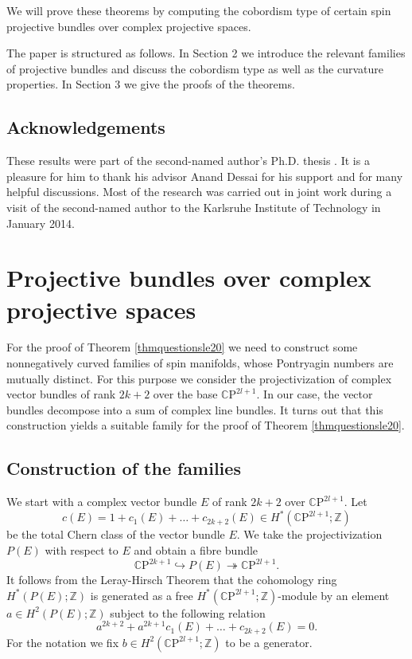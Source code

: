 \documentclass[10pt,a4paper]{amsart}
\theoremstyle{thm}
\theoremstyle{text}
\begin{document}
We will prove these theorems by computing the cobordism type of certain spin projective bundles over complex projective spaces.
\medskip

The paper  is structured as follows. In Section 2 we introduce the relevant families of projective bundles and discuss the cobordism type as well as the curvature properties. In Section 3 we give the proofs of the theorems.

\subsection*{Acknowledgements} These results were part of the second-named author's Ph.D. thesis \cite{Wei14}. It is a pleasure for him to thank  his advisor Anand Dessai for his support and for many helpful discussions. Most of the research was carried out in joint work during a visit of the second-named author to the Karlsruhe Institute of Technology in January 2014.

\section{Projective bundles over complex projective spaces}

For the proof of Theorem \ref{thmquestionsle20} we need to construct some nonnegatively curved families of spin manifolds, whose Pontryagin numbers are mutually distinct. For this purpose we consider the projectivization of complex vector bundles of rank $2k+2$ over the base  ${\mathbb{C}\mathrm{P}}^{2l+1}$.  In our case, the vector bundles decompose into a sum of complex line bundles. It turns out that this construction yields a suitable family for the proof of Theorem \ref{thmquestionsle20}.

\subsection{Construction of the families}

We start with a complex vector bundle $E$ of rank $2k+2$ over ${\mathbb{C}\mathrm{P}}^{2l+1}$. Let
\[ c(E) = 1 + c_1(E) + \ldots + c_{2k+2}(E) \in H^{\ast}({\mathbb{C}\mathrm{P}}^{2l+1}; {\mathbb{Z}})\]
be the total Chern class  of the vector bundle $E$. We take the projectivization $P(E)$ with respect to $E$  and obtain a fibre bundle 
\[ {\mathbb{C}\mathrm{P}}^{2k+1} \hookrightarrow P(E) \twoheadrightarrow {\mathbb{C}\mathrm{P}}^{2l+1}.\]
It follows from the Leray-Hirsch Theorem  that the cohomology  ring $H^{\ast}(P(E); {\mathbb{Z}})$ is generated as a free $H^{\ast}({\mathbb{C}\mathrm{P}}^{2l+1};{\mathbb{Z}})$-module by an element $a \in H^{2}(P(E); {\mathbb{Z}})$ subject to the following relation
\[ a^{2k+2} + a^{2k+1} c_1(E) + \ldots + c_{2k+2}(E) = 0.\]
For the notation we fix $b \in H^2({\mathbb{C}\mathrm{P}}^{2l+1}; {\mathbb{Z}})$ to be a generator. 
\medskip
\end{document}

